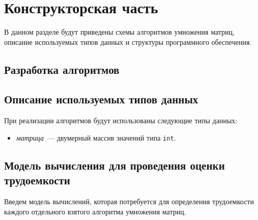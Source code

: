 \chapter{Конструкторская часть}

В данном разделе будут приведены схемы алгоритмов умножения матриц, описание используемых типов данных и структуры программного обеспечения.

\section{Разработка алгоритмов}





\section{Описание используемых типов данных}

При реализации алгоритмов будут использованы следующие типы данных:

\begin{itemize}
    \item \textit{матрица}~--- двумерный массив значений типа \texttt{int}.
\end{itemize}

\section{Модель вычисления для проведения оценки трудоемкости}

Введем модель вычислений, которая потребуется для определения трудоемкости каждого отдельного взятого алгоритма умножения матриц.

